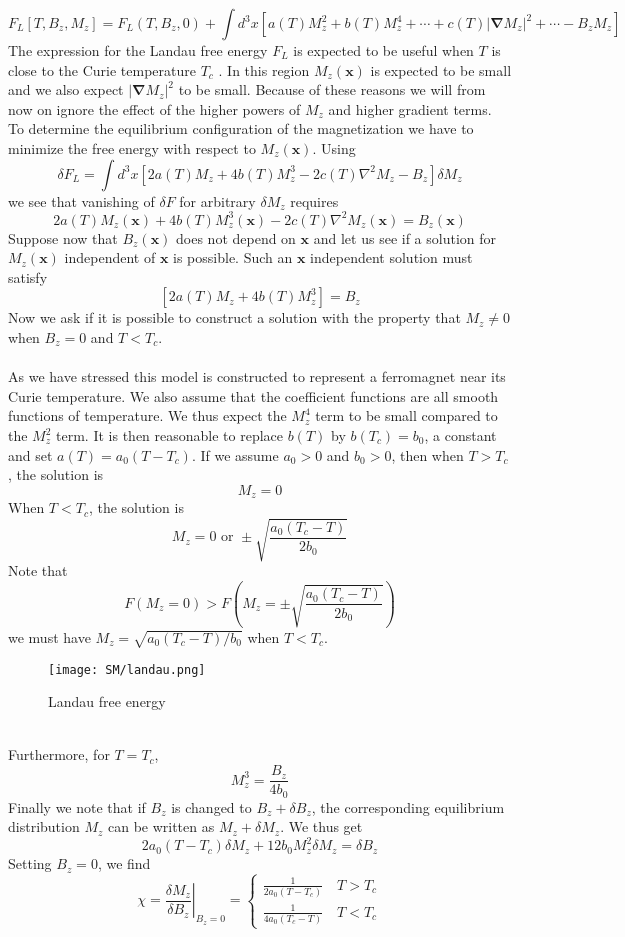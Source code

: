 \documentclass[cyan]{elegantnote}
\begin{document}
\[F_L[T,B_z,M_z] = F_L(T,B_z,0) + \int d^3x \left[ a(T)M_z^2 + b(T)M_z^4 + \cdots + c(T)|\bm{\nabla}M_z|^2 + \cdots - B_z M_z \right]\]
The expression for the Landau free energy $F_L$ is expected to be useful when $T$ is close to the Curie temperature $T_c$ . In this region $M_z(\bm{x})$ is expected to be small and we also expect $|\bm{\nabla}M_z|^2$ to be small. 
Because of these reasons we will from now on ignore the effect of the higher powers of $M_z$ and higher gradient terms. 
To determine the equilibrium configuration of the magnetization we have to minimize the free energy with respect to $M_z(\bm{x})$. Using
\[\delta F_L = \int d^3x [2a(T)M_z + 4b(T)M_z^3 - 2c(T)\nabla^2 M_z - B_z]\delta M_z\]
we see that vanishing of $\delta F$ for arbitrary $\delta M_z$ requires
\[2a(T)M_z(\bm{x}) + 4b(T)M_z^3(\bm{x}) - 2c(T)\nabla^2M_z(\bm{x}) = B_z(\bm{x})\]
Suppose now that $B_z(\bm{x})$ does not depend on $\bm{x}$ and let us see if a solution for $M_z(\bm{x})$ independent of $\bm{x}$ is possible. Such an $\bm{x}$ independent solution must satisfy
\[[2a(T)M_z + 4b(T)M_z^3] = B_z\]
Now we ask if it is possible to construct a solution with the property that $M_z \neq 0$ when $B_z = 0$ and $T < T_c$.
\\ \\
As we have stressed this model is constructed to represent a ferromagnet near its Curie temperature. We also assume that the coefficient functions are all smooth functions of temperature. 
We thus expect the $M_z^4$ term to be small compared to the $M_z^2$ term. It is then reasonable to replace $b(T)$ by $b(T_c) = b_0$, a constant and set $a(T) = a_0(T-T_c)$. If we assume $a_0 > 0$ and $b_0 > 0$, then when $T > T_c$, the solution is
\[M_z = 0\]
When $T < T_c$, the solution is
\[M_z = 0 \mbox{ or } \pm \sqrt{\frac{a_0(T_c-T)}{2b_0}}\]
Note that
\[F(M_z = 0) > F(M_z = \pm \sqrt{\frac{a_0(T_c-T)}{2b_0}})\]
we must have $M_z = \sqrt{a_0(T_c-T)/b_0}$ when $T < T_c$.
\begin{figure}[!h]
\centering
\texttt{[image: SM/landau.png]}
\caption{Landau free energy}
\end{figure}
\\
Furthermore, for $T = T_c$,
\[M_z^3 = \frac{B_z}{4b_0}\]
Finally we note that if $B_z$ is changed to $B_z + \delta B_z$, the corresponding equilibrium distribution $M_z$ can be written as $M_z + \delta M_z$. We thus get
\[2a_0(T-T_c)\delta M_z + 12b_0M_z^2\delta M_z = \delta B_z\]
Setting $B_z = 0$, we find
\[\chi = \left. \frac{\delta M_z}{\delta B_z} \right|_{B_z = 0} = \begin{cases} \frac{1}{2a_0(T-T_c)} \quad T>T_c \\ \frac{1}{4a_0(T_c-T)} \quad T<T_c \end{cases} \]
\end{document}
